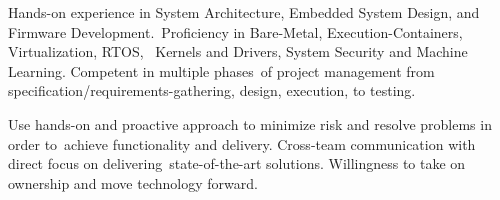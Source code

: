 Hands-on experience in System Architecture, Embedded System Design, and Firmware Development.\
Proficiency in Bare-Metal, Execution-Containers, Virtualization, RTOS, \faLinux\
Kernels and Drivers, System Security and Machine Learning. Competent in multiple phases\
of project management from specification/requirements-gathering, design, execution, to testing.\\
\par{Use hands-on and proactive approach to minimize risk and resolve problems in order to\ 
achieve functionality and delivery. Cross-team communication with direct focus on delivering\
state-of-the-art solutions. Willingness to take on ownership and move technology forward.\\}